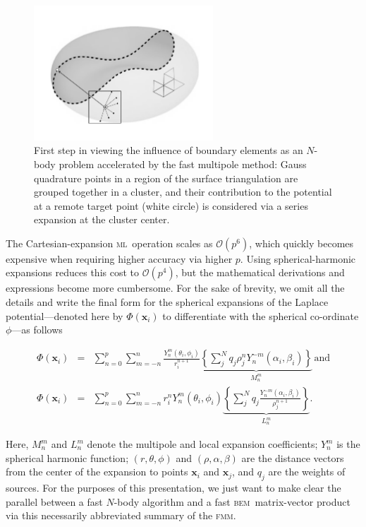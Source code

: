 \documentclass[final,leqno,]{siamltex1213}
\newcommand{\bem}{\textsc{bem}\xspace}
\newcommand{\fmm}{\textsc{fmm}\xspace}
\renewcommand{\O}[1]{\mathcal{O}(#1)}
\newcommand{\mtol}{\textsc{m}\texttwooldstyle\textsc{l}\xspace} %
\newcommand{\vect}[1]{\mathbf{#1}}
\begin{document}
\begin{figure}
\begin{center}
	\includegraphics[width=0.6\textwidth]{redbloodcell-panel-fmm.pdf}
	\caption{First step in viewing the influence of boundary elements as an $N$-body problem accelerated by the fast multipole method: Gauss quadrature points in a region of the surface triangulation are grouped together in a cluster, and their contribution to the potential at a remote target point (white circle) is considered via a series expansion at the cluster center.}
	\label{fig:rbc_fmmbox}
\end{center}
\end{figure}

The Cartesian-expansion \mtol\ operation scales as $\O{p^{6}}$, which quickly becomes expensive when requiring higher accuracy via higher $p$. Using spherical-harmonic expansions reduces this cost to  $\O{p^{4}}$, but the mathematical derivations and expressions become more cumbersome. For the sake of brevity, we omit all the details and write the final form for the spherical expansions of the Laplace potential---denoted here by $\Phi(\vect{x}_i)$ to differentiate with the spherical co-ordinate $\phi$---as follows

\begin{eqnarray}
	\Phi(\vect{x}_i) & = & \sum_{n=0}^{p}\sum_{m=-n}^{n}\frac{Y^{m}_n(\theta_i,\phi_i)}{r_i^{n+1}}\underbrace{\left \{ \sum_j^{N}q_j\rho^{n}_jY^{-m}_n(\alpha_i,\beta_i)\right \} }_{M^{m}_n} \, \text{and}\\
	\Phi(\vect{x}_i) & = & \sum_{n=0}^{p}\sum_{m=-n}^{n}r_i^{n}Y^{m}_n(\theta_i,\phi_i)\underbrace{\left \{ \sum_j^{N}q_j\frac{Y^{-m}_n(\alpha_i,\beta_i)}{\rho^{n+1}_j}\right \} }_{L^{m}_n}.
\end{eqnarray}

\noindent
Here, $M^{m}_n$ and $L^{m}_n$ denote the multipole and local expansion coefficients; $Y_{n}^{m}$ is the spherical harmonic function; $(r,\theta,\phi)$ and $(\rho,\alpha,\beta)$ are the distance vectors from the center of the expansion to points $\vect{x}_i$ and $\vect{x}_j$, and $q_j$ are the weights of sources. For the purposes of this presentation, we just want to make clear the parallel between a fast $N$-body algorithm and a fast \bem\ matrix-vector product via this necessarily abbreviated summary of the \fmm.
\end{document}
